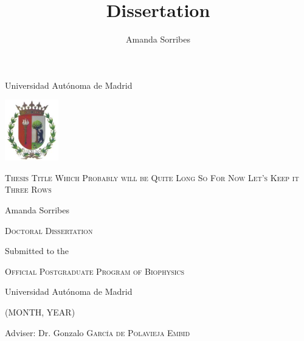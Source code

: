 \cleardoublepage
{}
\begin{titlepage}

\begin{center}

{\large Universidad Autónoma de Madrid}
\vspace{0.3cm}

\includegraphics[width=0.175\textwidth]{Frontmatter/Escudo_UAM}
\vspace{2.2cm}

\fontsize{30}{24}\selectfont
\textsc{ \huge Thesis Title Which Probably will be Quite Long So For Now Let's Keep it Three Rows}
\vspace{2.0cm}

\fontsize{11}{13}\selectfont
{\LARGE  Amanda Sorribes}
\vspace{3.6cm}

{\large \textsc{Doctoral Dissertation}}%
\vspace{0.16cm}

{\large Submitted to the}
\vspace{0.16cm}

\textsc{\large Official Postgraduate Program of Biophysics}%
\vspace{0.16cm}

{\large Universidad Autónoma de Madrid}
\vspace{0.16cm}

{\normalsize (MONTH, YEAR)}

\vfill

{\large Adviser: Dr. Gonzalo \textsc{García de Polavieja Embid}}
\vspace{0.15cm}


\vfill


\end{center}
\restoregeometry
\end{titlepage}

\thispagestyle{empty}

\title{Dissertation}
\author{Amanda Sorribes}
